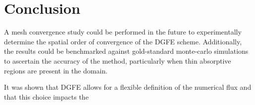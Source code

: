 \section{Conclusion}

A mesh convergence study could be performed in the future to experimentally determine the spatial order of convergence of the DGFE scheme.  Additionally, the results could be benchmarked against gold-standard monte-carlo simulations to ascertain the accuracy of the method, particularly when thin absorptive regions are present in the domain.

It was shown that DGFE allows for a flexible definition of the numerical flux and that this choice impacts the 